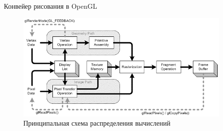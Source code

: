 \documentclass{beamer}
\begin{document}
\begin{frame}{Конвейер рисования в OpenGL}{}
	\begin{figure} 
		\includegraphics[width=0.95\textwidth]{images/OpenGL_graphics_pipeline.png}
		\caption {Принципальная схема распределения вычислений}
	\end{figure}
\end{frame}
\end{document}
